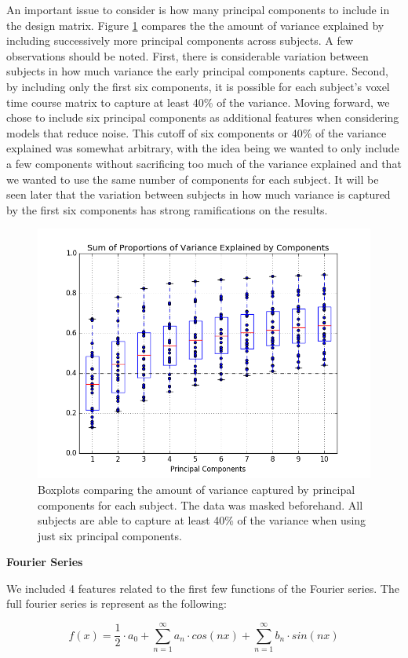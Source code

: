 An important issue to consider is how many principal components to include in 
the design matrix. Figure \ref{fig:pcabox} compares the the amount of variance 
explained by including successively more principal components across subjects. 
A few observations should be noted. First, there is considerable variation 
between subjects in how much variance the early principal components capture. 
Second, by including only the first six components, it is possible for each 
subject's voxel time course matrix to capture at least 40\% of the variance. 
Moving forward, we chose to include six principal components as additional 
features when considering models that reduce noise. This cutoff of six 
components or 40\% of the variance explained was somewhat arbitrary, with the 
idea being we wanted to only include a few components without sacrificing too 
much of the variance explained and that we wanted to use the same number of 
components for each subject. It will be seen later that the variation between 
subjects in how much variance is captured by the first six components has strong 
ramifications on the results. 

\begin{figure}[ht]
	\centering
	\includegraphics[width=.5\linewidth]{../images/pcaBOX.png}
 	\caption{Boxplots comparing the amount of variance captured by principal components for each subject. The data was masked beforehand. All subjects are able to capture at least 40\% of the variance when using just six principal components.}
 	\label{fig:pcabox}
\end{figure}


\vspace{2mm}
\textbf{Fourier Series}
\vspace{2mm}
\par We included 4 features related to the first few functions of the Fourier series.
The full fourier series is represent as the following:

\begin{equation}
f(x) = \frac{1}{2} \cdot a_0 + \sum_{n=1}^{\infty} a_n \cdot cos(n x) + \sum_{n=1}^{\infty} b_n \cdot  sin(n x)
\end{equation}


